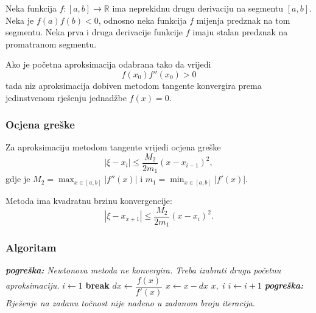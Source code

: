 Neka funkcija $f: [a,b] \to \mathbb{R}$ ima neprekidnu drugu derivaciju na
segmentu $[a,b]$. Neka je $f(a)f(b) < 0$, odnosno neka funkcija $f$ mijenja
predznak na tom segmentu.
Neka prva i druga derivacije funkcije $f$ imaju stalan predznak na promatranom
segmentu.

Ako je početna aproksimacija odabrana tako da vrijedi
$$
    f(x_0)f''(x_0) > 0
$$
tada niz aproksimacija dobiven metodom tangente konvergira prema jedinstvenom
rješenju jednadžbe $f(x) = 0$.

\subsubsection{Ocjena greške}

Za aproksimaciju metodom tangente vrijedi ocjena greške
$$
|\xi - x_i| \leq \dfrac{M_2}{2m_1}(x-x_{i-1})^2,
$$
gdje je $M_2 = \max_{x\in [a,b]}|f''(x)|$ i $m_1 = \min_{x\in [a,b]}|f'(x)|$.

Metoda ima kvadratnu brzinu konvergencije:
$$
|\xi - x_{x+1}| \leq \dfrac{M_2}{2m_1}(x-x_i)^2.
$$

\subsubsection{Algoritam}

\begin{algorithmic}
        \State \textit{\textbf{pogreška:}} \textit{Newtonova metoda ne konvergira. Treba izabrati drugu početnu aproksimaciju.}
    \Else
        \State $i \gets 1$
                \State \textbf{break} 
            \EndIf
            \State $dx \gets \dfrac{f(x)}{f'(x)}$
            \State $x \gets x - dx$
                \State \Return $x,\;i$
            \Else
                \State $i \gets i + 1$
            \EndIf
        \EndWhile
        \State \textit{\textbf{pogreška:}} \textit{Rješenje na zadanu točnost nije nađeno u zadanom broju iteracija.}
    \EndIf
\EndFunction
\end{algorithmic}
